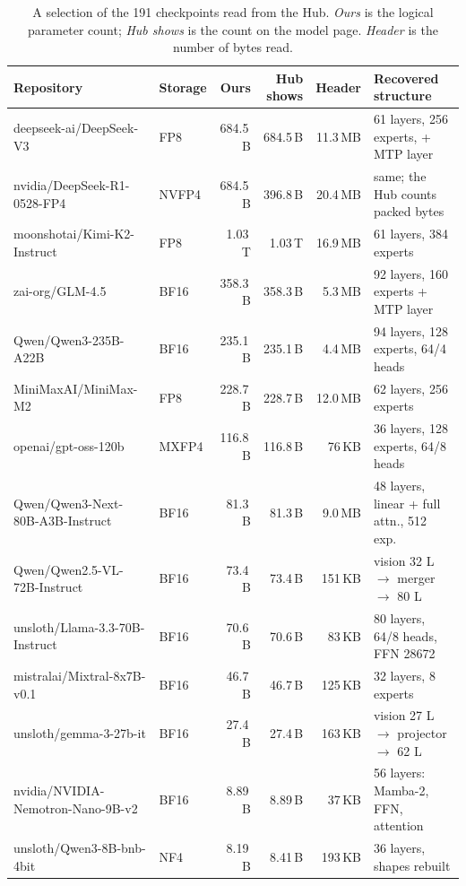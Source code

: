 {\begin{table}[t]
\centering
\scriptsize
\setlength{\tabcolsep}{3.5pt}
\begin{tabular}{@{}llrrrl@{}}
\toprule
Repository & Storage & Ours & Hub shows & Header & Recovered structure \\
\midrule
deepseek-ai/DeepSeek-V3 & FP8 & 684.5\,B & 684.5\,B & 11.3\,MB & 61 layers, 256 experts, + MTP layer \\
nvidia/DeepSeek-R1-0528-FP4 & NVFP4 & 684.5\,B & 396.8\,B & 20.4\,MB & same; the Hub counts packed bytes \\
moonshotai/Kimi-K2-Instruct & FP8 & 1.03\,T & 1.03\,T & 16.9\,MB & 61 layers, 384 experts \\
zai-org/GLM-4.5 & BF16 & 358.3\,B & 358.3\,B & 5.3\,MB & 92 layers, 160 experts + MTP layer \\
Qwen/Qwen3-235B-A22B & BF16 & 235.1\,B & 235.1\,B & 4.4\,MB & 94 layers, 128 experts, 64/4 heads \\
MiniMaxAI/MiniMax-M2 & FP8 & 228.7\,B & 228.7\,B & 12.0\,MB & 62 layers, 256 experts \\
openai/gpt-oss-120b & MXFP4 & 116.8\,B & 116.8\,B & 76\,KB & 36 layers, 128 experts, 64/8 heads \\
Qwen/Qwen3-Next-80B-A3B-Instruct & BF16 & 81.3\,B & 81.3\,B & 9.0\,MB & 48 layers, linear + full attn., 512 exp. \\
Qwen/Qwen2.5-VL-72B-Instruct & BF16 & 73.4\,B & 73.4\,B & 151\,KB & vision 32 L $\to$ merger $\to$ 80 L \\
unsloth/Llama-3.3-70B-Instruct & BF16 & 70.6\,B & 70.6\,B & 83\,KB & 80 layers, 64/8 heads, FFN 28672 \\
mistralai/Mixtral-8x7B-v0.1 & BF16 & 46.7\,B & 46.7\,B & 125\,KB & 32 layers, 8 experts \\
unsloth/gemma-3-27b-it & BF16 & 27.4\,B & 27.4\,B & 163\,KB & vision 27 L $\to$ projector $\to$ 62 L \\
nvidia/NVIDIA-Nemotron-Nano-9B-v2 & BF16 & 8.89\,B & 8.89\,B & 37\,KB & 56 layers: Mamba-2, FFN, attention \\
unsloth/Qwen3-8B-bnb-4bit & NF4 & 8.19\,B & 8.41\,B & 193\,KB & 36 layers, shapes rebuilt \\
\bottomrule
\end{tabular}
\caption{A selection of the 191 checkpoints read from the Hub. \emph{Ours} is the logical parameter count; \emph{Hub shows} is the count on the model page. \emph{Header} is the number of bytes read.}
\label{tab:hub}
\end{table}

}

